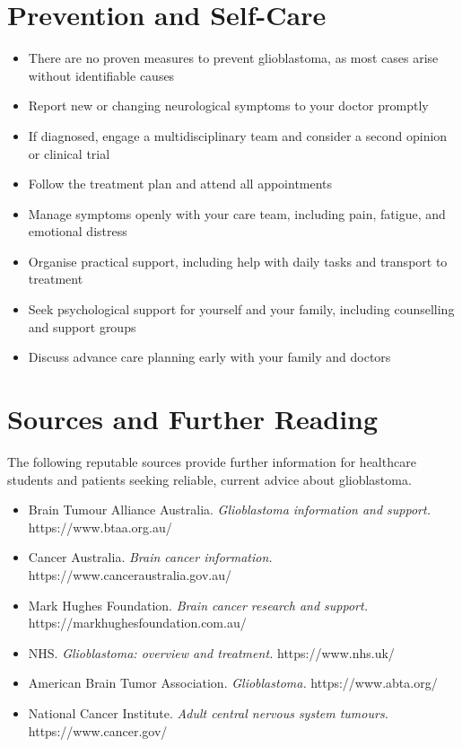 \section*{Prevention and Self-Care}
\begin{itemize}
    \item There are no proven measures to prevent glioblastoma, as most cases arise without identifiable causes
    \item Report new or changing neurological symptoms to your doctor promptly
    \item If diagnosed, engage a multidisciplinary team and consider a second opinion or clinical trial
    \item Follow the treatment plan and attend all appointments
    \item Manage symptoms openly with your care team, including pain, fatigue, and emotional distress
    \item Organise practical support, including help with daily tasks and transport to treatment
    \item Seek psychological support for yourself and your family, including counselling and support groups
    \item Discuss advance care planning early with your family and doctors
\end{itemize}

\section*{Sources and Further Reading}
The following reputable sources provide further information for healthcare students and patients seeking reliable, current advice about glioblastoma.

\begin{itemize}
    \item Brain Tumour Alliance Australia. \textit{Glioblastoma information and support.} https://www.btaa.org.au/
    \item Cancer Australia. \textit{Brain cancer information.} https://www.canceraustralia.gov.au/
    \item Mark Hughes Foundation. \textit{Brain cancer research and support.} https://markhughesfoundation.com.au/
    \item NHS. \textit{Glioblastoma: overview and treatment.} https://www.nhs.uk/
    \item American Brain Tumor Association. \textit{Glioblastoma.} https://www.abta.org/
    \item National Cancer Institute. \textit{Adult central nervous system tumours.} https://www.cancer.gov/
\end{itemize}
